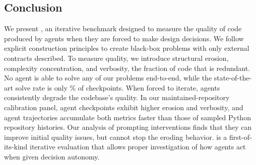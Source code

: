 \subsection{Conclusion}
\label{sec:conclusion}

We present \scb{}, an iterative benchmark designed to measure the quality of code produced by agents when they are forced to make design decisions. We follow explicit construction principles to create black-box problems with only external contracts described. To measure quality, we introduce structural erosion, complexity concentration, and verbosity, the fraction of code that is redundant. No agent is able to solve any of our \transProblems{} problems end-to-end, while the state-of-the-art solve rate is only \overallBestStrictSolveRate{}\% of \overallTotalCheckpoints{} checkpoints. When forced to iterate, agents consistently degrade the codebase's quality. In our maintained-repository calibration panel, agent checkpoints exhibit higher erosion and verbosity, and agent trajectories accumulate both metrics faster than those of sampled Python repository histories. Our analysis of prompting interventions finds that they can improve initial quality issues, but cannot stop the eroding behavior. \scb{} is a first-of-its-kind iterative evaluation that allows proper investigation of how agents act when given decision autonomy.
